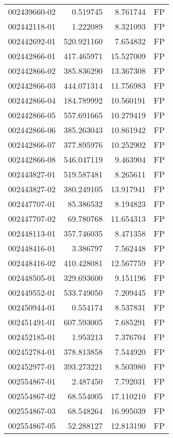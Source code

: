 \begin{tabular}{lrrl}
002439660-02 &    0.519745 &     8.761744 &   FP \\
002442118-01 &    1.222089 &     8.321093 &   FP \\
002442692-01 &  520.921160 &     7.654832 &   FP \\
002442866-01 &  417.465971 &    15.527009 &   FP \\
002442866-02 &  385.836290 &    13.367308 &   FP \\
002442866-03 &  444.071314 &    11.756983 &   FP \\
002442866-04 &  184.789992 &    10.560191 &   FP \\
002442866-05 &  557.691665 &    10.279419 &   FP \\
002442866-06 &  385.263043 &    10.861942 &   FP \\
002442866-07 &  377.895976 &    10.252902 &   FP \\
002442866-08 &  546.047119 &     9.463904 &   FP \\
002443827-01 &  519.587481 &     8.265611 &   FP \\
002443827-02 &  380.249105 &    13.917941 &   FP \\
002447707-01 &   85.386532 &     8.194823 &   FP \\
002447707-02 &   69.780768 &    11.654313 &   FP \\
002448113-01 &  357.746035 &     8.471358 &   FP \\
002448416-01 &    3.386797 &     7.562448 &   FP \\
002448416-02 &  410.428081 &    12.567759 &   FP \\
002448505-01 &  329.693600 &     9.151196 &   FP \\
002449552-01 &  533.749050 &     7.209445 &   FP \\
002450944-01 &    0.554174 &     8.537831 &   FP \\
002451491-01 &  607.593005 &     7.685291 &   FP \\
002452185-01 &    1.953213 &     7.376704 &   FP \\
002452784-01 &  378.813858 &     7.544920 &   FP \\
002452977-01 &  393.273221 &     8.503980 &   FP \\
002554867-01 &    2.487450 &     7.792031 &   FP \\
002554867-02 &   68.554005 &    17.110210 &   FP \\
002554867-03 &   68.548264 &    16.995039 &   FP \\
002554867-05 &   52.288127 &    12.813190 &   FP \\

\end{tabular}
